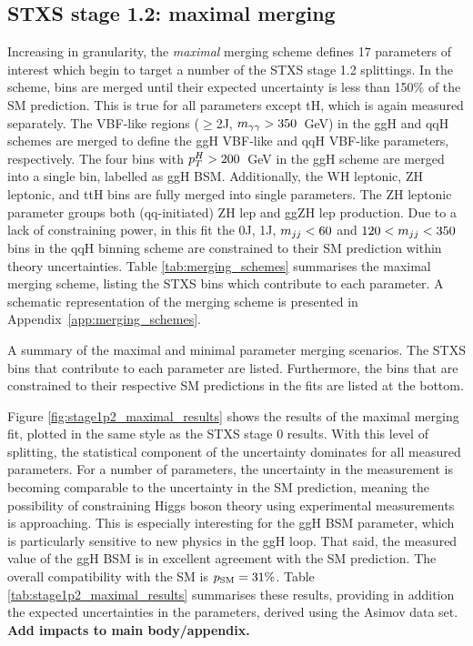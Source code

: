 \subsection{STXS stage 1.2: maximal merging}
Increasing in granularity, the \textit{maximal} merging scheme defines 17 parameters of interest which begin to target a number of the STXS stage 1.2 splittings. In the scheme, bins are merged until their expected uncertainty is less than 150\% of the SM prediction. This is true for all parameters except tH, which is again measured separately. The VBF-like regions ($\geq$2J, $m_{\gamma\gamma}>350$~GeV) in the ggH and qqH schemes are merged to define the ggH VBF-like and qqH VBF-like parameters, respectively. The four bins with $p_T^H>200$~GeV in the ggH scheme are merged into a single bin, labelled as ggH BSM. Additionally, the WH leptonic, ZH leptonic, and ttH bins are fully merged into single parameters. The ZH leptonic parameter groups both (qq-initiated) ZH lep and ggZH lep production. Due to a lack of constraining power, in this fit the 0J, 1J, $m_{jj}<60$ and $120<m_{jj}<350$ bins in the qqH binning scheme are constrained to their SM prediction within theory uncertainties. Table \ref{tab:merging_schemes} summarises the maximal merging scheme, listing the STXS bins which contribute to each parameter. A schematic representation of the merging scheme is presented in Appendix~\ref{app:merging_schemes}.

\begin{table}[htbp]
  \centering
  \scriptsize
  \renewcommand{\arraystretch}{1.2}
  \setlength{\tabcolsep}{2.2pt}
  \caption[Summary of the maximal and minimal parameter merging scenarios]
  {
    A summary of the maximal and minimal parameter merging scenarios. 
    The STXS bins that contribute to each parameter are listed. 
    Furthermore, the bins that are constrained to their respective SM predictions 
    in the fits are listed at the bottom.
  }
  \label{tab:merging_schemes}
  \hspace*{-1cm}
  
  \hspace*{-1cm}
\end{table}

Figure \ref{fig:stage1p2_maximal_results} shows the results of the maximal merging fit, plotted in the same style as the STXS stage 0 results. With this level of splitting, the statistical component of the uncertainty dominates for all measured parameters. For a number of parameters, the uncertainty in the measurement is becoming comparable to the uncertainty in the SM prediction, meaning the possibility of constraining Higgs boson theory using experimental measurements is approaching. This is especially interesting for the ggH BSM parameter, which is particularly sensitive to new physics in the ggH loop. That said, the measured value of the ggH BSM \xsbr is in excellent agreement with the SM prediction. The overall compatibility with the SM is $p_{\rm{SM}}=31\%$. Table \ref{tab:stage1p2_maximal_results} summarises these results, providing in addition the expected uncertainties in the parameters, derived using the Asimov data set. \textbf{Add impacts to main body/appendix.}

